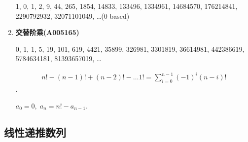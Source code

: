 \begin{enumerate}
          1, 0, 1, 2, 9, 44, 265, 1854, 14833, 133496, 1334961, 14684570, 176214841, 2290792932, 32071101049, \dots \;(0-based)
          
    \item \textbf{交替阶乘(A005165)}
          
          0, 1, 1, 5, 19, 101, 619, 4421, 35899, 326981, 3301819, 36614981, 442386619, 5784634181, 81393657019, \dots
          
          \[
              \begin{aligned} n! - (n - 1)! + (n - 2)! - \dots 1! = \sum_{i = 0} ^ {n - 1} (-1)^i (n - i)! \end{aligned}
          \].
          
          \( a_0 = 0,\; a_n = n! - a_{n - 1} \).
\end{enumerate}

\subsection{线性递推数列}

